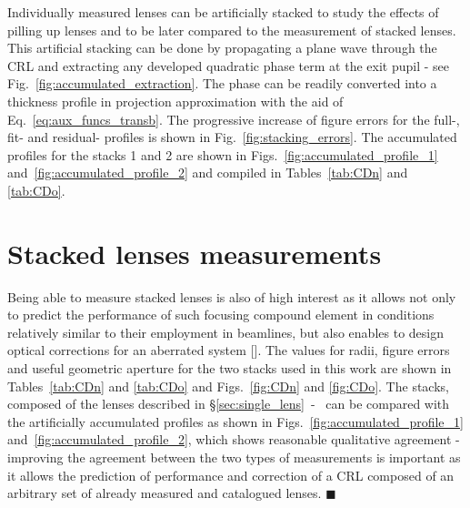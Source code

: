 \begin{refsection}
Individually measured lenses can be artificially stacked to study the effects of pilling up lenses and to be later compared to the measurement of stacked lenses. This artificial stacking can be done by propagating a plane wave through the CRL and extracting any developed quadratic phase term at the exit pupil - see Fig.~\ref{fig:accumulated_extraction}. The phase can be readily converted into a thickness profile in projection approximation with the aid of Eq.~\ref{eq:aux_funcs_transb}. The progressive increase of figure errors for the full-, fit- and residual- profiles is shown in Fig.~\ref{fig:stacking_errors}. The accumulated profiles for the stacks 1 and 2 are shown in Figs.~\ref{fig:accumulated_profile_1} and~\ref{fig:accumulated_profile_2} and compiled in Tables~\ref{tab:CDn} and \ref{tab:CDo}.  

\section{Stacked lenses measurements}\label{sec:lens_stack}

Being able to measure stacked lenses is also of high interest as it allows not only to predict the performance of such focusing compound element in conditions relatively similar to their employment in beamlines, but also enables to design optical corrections for an aberrated system [\cite{Seiboth2017, Seiboth2020}]. The values for radii, figure errors and useful geometric aperture for the two stacks used in this work are shown in Tables~\ref{tab:CDn} and \ref{tab:CDo} and Figs.~\ref{fig:CDn} and \ref{fig:CDo}. The stacks, composed of the lenses described in \S\ref{sec:single_lens}~-~\textit{} can be compared with the artificially accumulated profiles as shown in Figs.~\ref{fig:accumulated_profile_1} and~\ref{fig:accumulated_profile_2}, which shows reasonable qualitative agreement - improving the agreement between the two types of measurements is important as it allows the prediction of performance and correction of a CRL composed of an arbitrary set of already measured and catalogued lenses. $\blacksquare$


\end{refsection}
